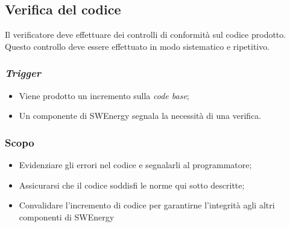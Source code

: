 \subsection{Verifica del codice}
\label{verifica-codice}

Il verificatore deve effettuare dei controlli di conformità sul codice
prodotto. Questo controllo deve essere effettuato in modo sistematico e
ripetitivo.

\subsubsection{\textit{Trigger}}
\begin{itemize}
	\item Viene prodotto un incremento sulla \textit{code base};

	\item Un componente di SWEnergy segnala la necessità di una verifica.
\end{itemize}

\subsubsection{Scopo}
\begin{itemize}
	\item Evidenziare gli errori nel codice e segnalarli al programmatore;

	\item Assicurarsi che il codice soddisfi le norme qui sotto descritte;

	\item Convalidare l'incremento di codice per garantirne l'integrità agli
	      altri componenti di SWEnergy
\end{itemize}


